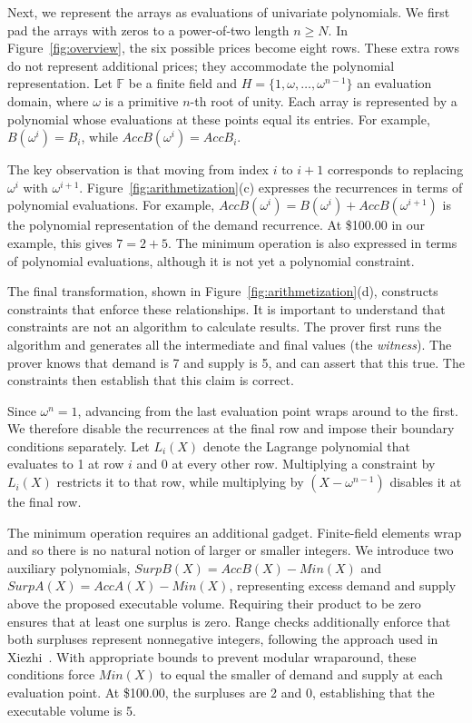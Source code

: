 Next, we represent the arrays as evaluations of univariate polynomials. We first pad the arrays with zeros to a power-of-two length $n\geq N$. In Figure~\ref{fig:overview}, the six possible prices become eight rows. These extra rows do not represent additional prices; they accommodate the polynomial representation. Let $\mathbb{F}$ be a finite field and $H=\{1,\omega,\ldots,\omega^{n-1}\}$ an evaluation domain, where $\omega$ is a primitive $n$-th root of unity. Each array is represented by a polynomial whose evaluations at these points equal its entries. For example, $B(\omega^i)=B_i$, while $AccB(\omega^i)=AccB_i$.

The key observation is that moving from index $i$ to $i+1$ corresponds to replacing $\omega^i$ with $\omega^{i+1}$. Figure~\ref{fig:arithmetization}(c) expresses the recurrences in terms of polynomial evaluations. For example, $AccB(\omega^i)=B(\omega^i)+AccB(\omega^{i+1})$ is the polynomial representation of the demand recurrence. At \$100.00 in our example, this gives $7=2+5$. The minimum operation is also expressed in terms of polynomial evaluations, although it is not yet a polynomial constraint.

The final transformation, shown in Figure~\ref{fig:arithmetization}(d), constructs constraints that enforce these relationships. It is important to understand that constraints are not an algorithm to calculate results. The prover first runs the algorithm and generates all the intermediate and final values (the \emph{witness}). The prover knows that demand is 7 and supply is 5, and can assert that this true. The constraints then establish that this claim is correct.

Since $\omega^n=1$, advancing from the last evaluation point wraps around to the first. We therefore disable the recurrences at the final row and impose their boundary conditions separately. Let $L_i(X)$ denote the Lagrange polynomial that evaluates to 1 at row $i$ and 0 at every other row. Multiplying a constraint by $L_i(X)$ restricts it to that row, while multiplying by $(X-\omega^{n-1})$ disables it at the final row.

The minimum operation requires an additional gadget. Finite-field elements wrap and so there is no natural notion of larger or smaller integers. We introduce two auxiliary polynomials, $SurpB(X)=AccB(X)-Min(X)$ and $SurpA(X)=AccA(X)-Min(X)$, representing excess demand and supply above the proposed executable volume. Requiring their product to be zero ensures that at least one surplus is zero. Range checks additionally enforce that both surpluses represent nonnegative integers, following the approach used in Xiezhi~\cite{DC26}. With appropriate bounds to prevent modular wraparound, these conditions force $Min(X)$ to equal the smaller of demand and supply at each evaluation point. At \$100.00, the surpluses are 2 and 0, establishing that the executable volume is 5.


